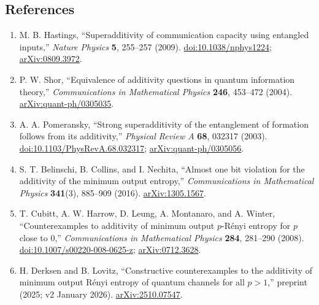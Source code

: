 \subsection*{References}

\begin{enumerate}[label={},leftmargin=4.8em,labelsep=0.5em]
  \footnotesize
  \item[\textup{[Has09]}]\label{ref:cf-has09}
  M. B. Hastings, ``Superadditivity of communication capacity using entangled inputs,'' \emph{Nature Physics} \textbf{5}, 255--257 (2009).
\href{https://doi.org/10.1038/nphys1224}{doi:10.1038/nphys1224};
\href{https://arxiv.org/abs/0809.3972}{arXiv:0809.3972}.

  \item[\textup{[Sho04]}]\label{ref:cf-sho04}
  P. W. Shor, ``Equivalence of additivity questions in quantum information theory,'' \emph{Communications in Mathematical Physics} \textbf{246}, 453--472 (2004).
\href{https://arxiv.org/abs/quant-ph/0305035}{arXiv:quant-ph/0305035}.

  \item[\textup{[Pom03]}]\label{ref:cf-pom03}
  A. A. Pomeransky, ``Strong superadditivity of the entanglement of formation follows from its additivity,'' \emph{Physical Review A} \textbf{68}, 032317 (2003).
\href{https://doi.org/10.1103/PhysRevA.68.032317}{doi:10.1103/PhysRevA.68.032317};
\href{https://arxiv.org/abs/quant-ph/0305056}{arXiv:quant-ph/0305056}.

  \item[\textup{[BCN16]}]\label{ref:cf-bcn16}
  S. T. Belinschi, B. Collins, and I. Nechita, ``Almost one bit violation for the additivity of the minimum output entropy,'' \emph{Communications in Mathematical Physics} \textbf{341}(3), 885--909 (2016).
\href{https://arxiv.org/abs/1305.1567}{arXiv:1305.1567}.

  \item[\textup{[CHL+08]}]\label{ref:cf-crs08}
  T. Cubitt, A. W. Harrow, D. Leung, A. Montanaro, and A. Winter, ``Counterexamples to additivity of minimum output $p$-R\'enyi entropy for $p$ close to $0$,'' \emph{Communications in Mathematical Physics} \textbf{284}, 281--290 (2008).
\href{https://doi.org/10.1007/s00220-008-0625-z}{doi:10.1007/s00220-008-0625-z};
\href{https://arxiv.org/abs/0712.3628}{arXiv:0712.3628}.

  \item[\textup{[DL26]}]\label{ref:cf-dl26}
  H. Derksen and B. Lovitz, ``Constructive counterexamples to the additivity of minimum output R\'enyi entropy of quantum channels for all $p>1$,'' preprint (2025; v2 January 2026).
\href{https://arxiv.org/abs/2510.07547}{arXiv:2510.07547}.


\end{enumerate}
